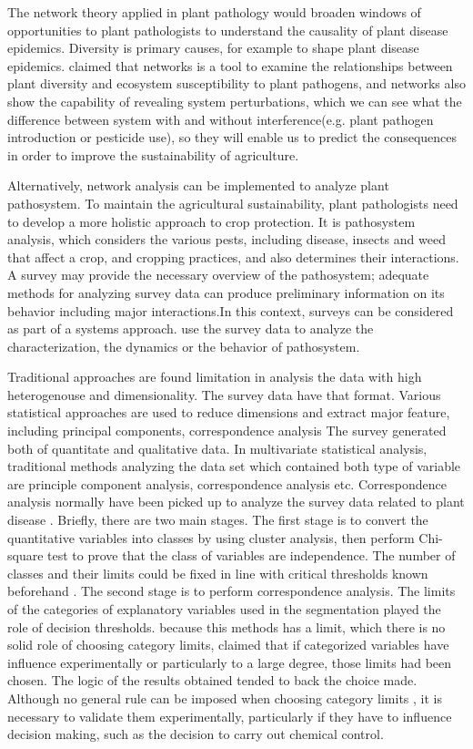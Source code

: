 The network theory applied in plant pathology would broaden windows of opportunities to plant pathologists to understand the causality of plant disease epidemics. Diversity is primary causes, for example to shape plant disease epidemics.  claimed that networks is a tool to examine the relationships between plant diversity and ecosystem susceptibility to plant pathogens, and networks also show the capability of revealing system perturbations, which we can see what the difference between system with and without interference(e.g. plant pathogen introduction or pesticide use), so they will enable us to predict the consequences in order to improve the sustainability of agriculture.

Alternatively, network analysis can be implemented to analyze plant pathosystem. To maintain the agricultural sustainability, plant pathologists need to develop a more holistic approach to crop protection. It is pathosystem analysis, which considers the various pests, including disease, insects and weed that affect a crop, and cropping practices, and also determines their interactions. A survey may provide the necessary overview of the pathosystem; adequate methods for analyzing survey data can produce preliminary information on its behavior including major interactions.In this context, surveys can be considered as part of a systems approach. use the survey data to analyze the characterization, the dynamics or the behavior of pathosystem.

Traditional approaches are found limitation in analysis the data with high heterogenouse and dimensionality. The survey data have that format. Various statistical approaches are used to reduce dimensions and extract major feature, including principal components, correspondence analysis The survey generated both of quantitate and qualitative data. In multivariate statistical analysis, traditional methods analyzing the data set which contained both type of variable are principle component analysis, correspondence analysis etc. Correspondence analysis normally have been picked up to analyze the survey data related to plant disease . Briefly, there are two main stages. The first stage is to convert the quantitative variables into classes by using cluster analysis, then perform Chi-square test to prove that the class of variables are independence. The number of classes and their limits could be fixed in line with critical thresholds known beforehand . The second stage is to perform correspondence analysis. The limits of the categories of explanatory variables used in the segmentation played the role of decision thresholds. because this methods has a limit, which there is no solid role of choosing category limits,  claimed that if categorized variables have influence experimentally or particularly to a large degree, those limits had been chosen. The logic of the results obtained tended to back the choice made. Although no general rule can be imposed when choosing category limits , it is necessary to validate them experimentally, particularly if they have to influence decision making, such as the decision to carry out chemical control.
 
